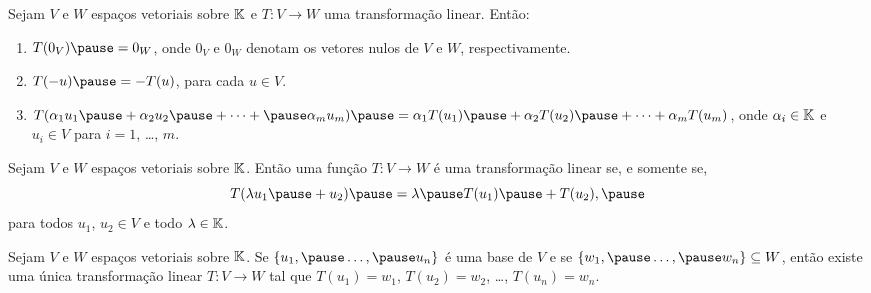 \documentclass{beamer}
\begin{document}
\begin{frame}
    \begin{lema}
        Sejam $V$ e $W$ espaços vetoriais sobre $\mathbb{K}$ \pause e $T \colon V \to W$ uma transformação linear. \pause Então:\pause
        \begin{enumerate}[label={\roman*})]\label{transformacao_linear_propriedades_basicas}
            \item $T(0_V) \pause = 0_W$, \pause onde $0_V$ e $0_W$ \pause denotam os vetores nulos de $V$ e $W$, respectivamente.\pause

            \vspace*{1cm}

            \item $T(-u) \pause = -T(u)$, \pause para cada $u \in V$.\pause

            \vspace{1cm}

            \item $T(\alpha_1u_1 \pause + \alpha_2u_2 \pause + \cdots + \pause \alpha_mu_m) \pause = \alpha_1 T(u_1) \pause + \alpha_2 T(u_2) \pause + \cdots + \alpha_m T(u_m)$, \pause onde $\alpha_i \in \mathbb{K}$ e $u_i \in V$ para $i = 1$, \dots, $m$.
        \end{enumerate}
    \end{lema}
\end{frame}

\begin{frame}
    \begin{lema}
        Sejam $V$ e $W$ espaços vetoriais sobre $\mathbb{K}$. \pause Então uma função $T \colon V \to W$ \pause é uma transformação linear se, e somente se,\pause
        \[
        T(\lambda u_1 \pause + u_2) \pause = \lambda \pause T(u_1) \pause + T(u_2),\pause
        \]
        para todos $u_1$, $u_2 \in V$ \pause e todo $\lambda \in \mathbb{K}$.
    \end{lema}
\end{frame}

\begin{frame}
    \begin{teorema}\label{existencia_de_transformacao_unica_dado_valores}
        Sejam $V$ e $W$ espaços vetoriais sobre $\mathbb{K}$. \pause Se $\{u_1, \pause \dots, \pause u_n\}$ \pause é uma base de $V$ \pause e se $\{w_1, \pause \dots, \pause w_n\} \subseteq W$, \pause então existe uma única transformação linear \pause $T \colon V \to W$ \pause tal que $T(u_1) = w_1$, \pause $T(u_2) = w_2$, \pause \dots, $T(u_n) = w_n$.
    \end{teorema}
\end{frame}
\end{document}
